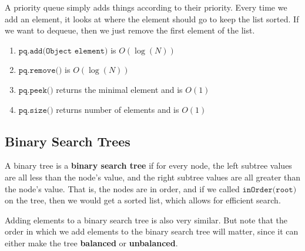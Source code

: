   \begin{definition}
    A priority queue simply adds things according to their priority. Every time we add an element, it looks at where the element should go to keep the list sorted. If we want to dequeue, then we just remove the first element of the list. 
    \begin{enumerate}
      \item $\texttt{pq.add(Object element)}$ is $O(\log(N))$
      \item $\texttt{pq.remove()}$ is $O(\log(N))$ 
      \item $\texttt{pq.peek()}$ returns the minimal element and is $O(1)$
      \item $\texttt{pq.size()}$ returns number of elements and is $O(1)$
    \end{enumerate}
  \end{definition}

\subsection{Binary Search Trees}

  \begin{definition}
    A binary tree is a \textbf{binary search tree} if for every node, the left subtree values are all less than the node's value, and the right subtree values are all greater than the node's value. That is, the nodes are in order, and if we called $\texttt{inOrder(root)}$ on the tree, then we would get a sorted list, which allows for efficient search. 
  \end{definition}

  Adding elements to a binary search tree is also very similar. But note that the order in which we add elements to the binary search tree will matter, since it can either make the tree \textbf{balanced} or \textbf{unbalanced}. 

